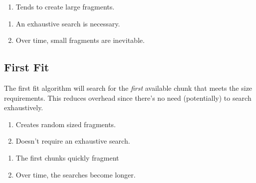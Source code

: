 \documentclass{report}
\begin{document}
\begin{tcbraster}[raster columns=2, raster equal height, raster force size=false]
  \begin{tcolorbox}[colback=green!5!white,colframe=black!75!green,title=Advantages]
    \begin{enumerate}[label=\textit{(\roman*)}]
    \item Tends to create large fragments.
    \end{enumerate}
  \end{tcolorbox}
  \begin{tcolorbox}[colback=red!5!white,colframe=black!40!red,title=Disadvantages]
    \begin{enumerate}[label=\textit{(\roman*)}]
    \item An exhaustive search is necessary.
    \item Over time, small fragments are inevitable.
    \end{enumerate}
  \end{tcolorbox}
\end{tcbraster}


\subsection{First Fit}
The first fit algorithm will search for the \textit{first} available chunk that meets the size
requirements. This reduces overhead since there's no need (potentially) to search exhaustively.

\begin{tcbraster}[raster columns=2, raster equal height, raster force size=false]
  \begin{tcolorbox}[colback=green!5!white,colframe=black!75!green,title=Advantages]
    \begin{enumerate}[label=\textit{(\roman*)}]
    \item Creates random sized fragments.
    \item Doesn't require an exhaustive search.
    \end{enumerate}
  \end{tcolorbox}
  \begin{tcolorbox}[colback=red!5!white,colframe=black!40!red,title=Disadvantages]
    \begin{enumerate}[label=\textit{(\roman*)}]
    \item The first chunks quickly fragment
    \item Over time, the searches become longer.
    \end{enumerate}
  \end{tcolorbox}
\end{tcbraster}
\end{document}
